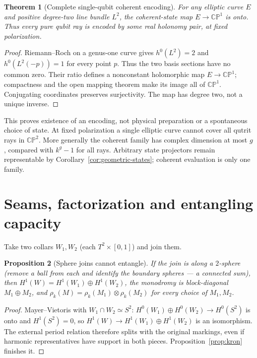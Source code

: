 \documentclass[11pt]{article}
\newtheorem{theorem}{Theorem}[section]
\newtheorem{proposition}[theorem]{Proposition}
\theoremstyle{definition}
\theoremstyle{remark}
\begin{document}
\begin{theorem}[Complete single-qubit coherent encoding]\label{thm:qubit-coverage}
For any elliptic curve $E$ and positive degree-two line bundle $L^2$,
the coherent-state map $E\to\mathbb{CP}^1$ is onto. Thus every pure qubit
ray is encoded by some real holonomy pair, at fixed polarization.
\end{theorem}
\begin{proof}
Riemann--Roch on a genus-one curve gives $h^0(L^2)=2$ and
$h^0(L^2(-p))=1$ for every point $p$. Thus the two basis sections have
no common zero. Their ratio defines a nonconstant holomorphic map
$E\to\mathbb{CP}^1$; compactness and the open mapping theorem make its
image all of $\mathbb{CP}^1$. Conjugating coordinates preserves
surjectivity. The map has degree two, not a unique inverse.
\end{proof}
This proves existence of an encoding, not physical preparation or a
spontaneous choice of state. At fixed polarization a single elliptic
curve cannot cover all qutrit rays in $\mathbb{CP}^2$. More generally the
coherent family has complex dimension at most $g$, compared with
$k^g-1$ for all rays. Arbitrary state projectors remain representable by
Corollary~\ref{cor:geometric-states}; coherent evaluation is only one family.

\section{Seams, factorization and entangling capacity}\label{sec:seam}

Take two collars $W_1, W_2$ (each $T^2\times[0,1]$) and join them.

\begin{proposition}[Sphere joins cannot entangle]\label{prop:sphere}
If the join is along a $2$-sphere (remove a ball from each and identify the
boundary spheres --- a connected sum), then $H^1(W) = H^1(W_1)\oplus H^1(W_2)$,
the monodromy is block-diagonal $M_1\oplus M_2$, and $\rho_k(M) =
\rho_k(M_1)\otimes\rho_k(M_2)$ for every choice of $M_1, M_2$.
\end{proposition}
\begin{proof}
Mayer--Vietoris with $W_1\cap W_2 \simeq S^2$: $H^0(W_1)\oplus H^0(W_2)\to
H^0(S^2)$ is onto and $H^1(S^2) = 0$, so $H^1(W)\to H^1(W_1)\oplus H^1(W_2)$
is an isomorphism. The external period relation therefore splits with the
original markings, even if harmonic representatives have support in both
pieces. Proposition~\ref{prop:kron} finishes it.
\end{proof}
\end{document}
